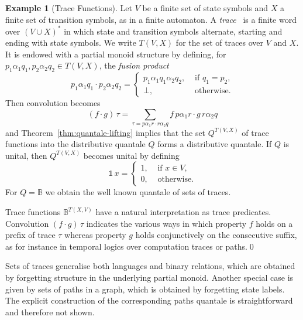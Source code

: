 \documentclass[12pt]{article}
\newcommand{\Al}{X}
\newcommand{\State}{V}
\theoremstyle{definition}
\newtheorem{example}{Example}
\newcommand{\unit}{\mathbb{1}}
\begin{document}
\begin{example}[Trace Functions]\label{ex:traces}
  Let $\State$ be a finite set of state symbols and $\Al$ a finite set
  of transition symbols, as in a finite automaton. A
  \emph{trace}~\cite{Eilenberg} is a finite word over
  $(\State\cup\Al)^\ast$ in which state and transition symbols
  alternate, starting and ending with state symbols. We write
  $T(\State,\Al)$ for the set of traces over $\State$ and $\Al$. It is
  endowed with a partial monoid structure by defining, for
  $p_1\alpha_1q_1,p_2\alpha_2q_2\in T(\State,\Al)$, the \emph{fusion
    product}
  \begin{equation*}
    p_1\alpha_1q_1\cdot p_2\alpha_2q_2 =
    \begin{cases}
      p_1\alpha_1q_1\alpha_2q_2, & \text{ if } q_1=p_2,\\
      \bot, & \text{ otherwise}.
    \end{cases}
  \end{equation*}
  Then convolution becomes 
\begin{equation*}
  (f\cdot g)\, \tau = \sum_{\tau=p\alpha_1 r\cdot r\alpha_2 q} f\, p\alpha_1 r\cdot g\, r\alpha_2 q
\end{equation*}
and Theorem~\ref{thm:quantale-lifting} implies that the set
$Q^{T(\State,\Al)}$ of trace functions into the distributive quantale
$Q$ forms a distributive quantale. If $Q$ is unital, then
$Q^{T(\State,\Al)}$ becomes unital by defining
\begin{equation*}
  \unit\, x =
  \begin{cases}
    1, & \text{ if } x\in \State,\\
    0, & \text{ otherwise}.
  \end{cases}
\end{equation*}
For $Q=\mathbb{B}$ we obtain the well known quantale of sets of
traces.

Trace functions $\mathbb{B}^{T(\Al,\State)}$ have a natural
interpretation as trace predicates. Convolution $(f\cdot g)\, \tau$
indicates the various ways in which property $f$ holds on a prefix of
trace $\tau$ whereas property $g$ holds conjunctively on the consecutive
suffix, as for instance in temporal logics over computation traces or
paths.\qed
\end{example}

Sets of traces generalise both languages and binary relations, which
are obtained by forgetting structure in the underlying partial
monoid. Another special case is given by sets of paths in a graph,
which is obtained by forgetting state labels. The explicit
construction of the corresponding paths quantale is straightforward
and therefore not shown.
\end{document}
